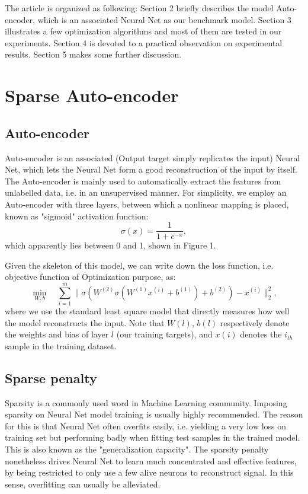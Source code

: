 \documentclass{article} %
\begin{document}
The article is organized as following: Section 2 briefly describes the model Auto-encoder, which is an associated Neural Net as our benchmark model. Section 3 illustrates a few optimization algorithms and most of them are tested in our experiments. Section 4 is devoted to a practical observation on experimental results. Section 5 makes some further discussion.


\section{Sparse Auto-encoder}
\subsection{Auto-encoder}
Auto-encoder is an associated (Output target simply replicates the input) Neural Net, which lets the Neural Net form a good reconstruction of the input by itself. The Auto-encoder is mainly used to automatically extract the features from unlabelled data, i.e. in an unsupervised manner. For simplicity, we employ an Auto-encoder with three layers, between which a nonlinear mapping is placed, known as "sigmoid" activation function:
$$
\sigma(x) = \frac{1}{1+e^{-x}},
$$
which apparently lies between 0 and 1, shown in Figure 1.

Given the skeleton of this model, we can write down the loss function, i.e. objective function of Optimization purpose, as:
$$
\min_{W, b} \quad \sum_{i=1}^m \| \sigma( W^{(2)} \sigma( W^{(1)} x^{(i)}+b^{(1)} )+b^{(2)} )-x^{(i)} \|_2^2,
$$
where we use the standard least square model that directly measures how well the model reconstructs the input. Note that $W{(l)}$, $b{(l)}$ respectively denote the weights and bias of layer $l$ (our training targets), and $x{(i)}$ denotes the $i_{th}$ sample in the training dataset.


\subsection{Sparse penalty}
Sparsity is a commonly used word in Machine Learning community. Imposing sparsity on Neural Net model training is usually highly recommended. The reason for this is that Neural Net often overfits easily, i.e. yielding a very low loss on training set but performing badly when fitting test samples in the trained model. This is also known as the "generalization capacity". The sparsity penalty nonetheless drives Neural Net to learn much concentrated and effective features, by being restricted to only use a few alive neurons to reconstruct signal. In this sense, overfitting can usually be alleviated.
\end{document}
